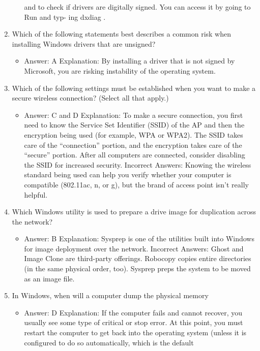 \documentclass{article}
\begin{document}
\begin{enumerate}
\begin{itemize}
and to check if drivers are digitally signed. You can access it by going to Run and typ-
ing dxdiag .
     \end{itemize}
      \item Which of the following statements best describes a common risk
when installing Windows drivers that are unsigned?
     \begin{itemize}
         \item Answer: A
Explanation: By installing a driver that is not signed by Microsoft, you are risking
instability of the operating system.
     \end{itemize}
      \item Which of the following settings must be established when you
want to make a secure wireless connection? (Select all that apply.)
     \begin{itemize}
         \item  Answer: C and D
Explanation: To make a secure connection, you first need to know the Service Set
Identifier (SSID) of the AP and then the encryption being used (for example, WPA or
WPA2). The SSID takes care of the “connection” portion, and the encryption takes care
of the “secure” portion. After all computers are connected, consider disabling the SSID
for increased security.
Incorrect Answers: Knowing the wireless standard being used can help you verify
whether your computer is compatible (802.11ac, n, or g), but the brand of access point
isn’t really helpful.
     \end{itemize}
      \item Which Windows utility is used to prepare a drive image for duplication
across the network?
     \begin{itemize}
         \item Answer: B
Explanation: Sysprep is one of the utilities built into Windows for image deployment
over the network.
Incorrect Answers: Ghost and Image Clone are third-party offerings. Robocopy copies
entire directories (in the same physical order, too). Sysprep preps the system to be
moved as an image file.
     \end{itemize}
      \item In Windows, when will a computer dump the physical memory
     \begin{itemize}
         \item Answer: D
Explanation: If the computer fails and cannot recover, you usually see some type of
critical or stop error. At this point, you must restart the computer to get back into the
operating system (unless it is configured to do so automatically, which is the default

\end{itemize}
\end{enumerate}
\end{document}
